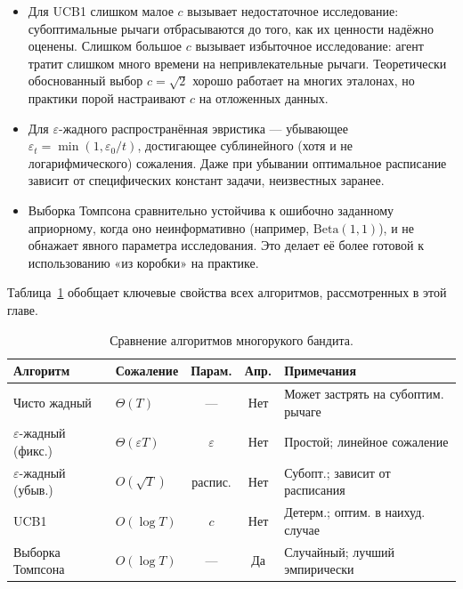 \begin{itemize}[leftmargin=*]
\item Для UCB1 слишком малое $c$ вызывает недостаточное исследование: субоптимальные рычаги отбрасываются до того, как их ценности надёжно оценены.  Слишком большое $c$ вызывает избыточное исследование: агент тратит слишком много времени на непривлекательные рычаги.  Теоретически обоснованный выбор $c=\sqrt{2}$ хорошо работает на многих эталонах, но практики порой настраивают $c$ на отложенных данных.
\item Для $\varepsilon$-жадного распространённая эвристика — убывающее $\varepsilon_t = \min(1, \varepsilon_0/t)$, достигающее сублинейного (хотя и не логарифмического) сожаления.  Даже при убывании оптимальное расписание зависит от специфических констант задачи, неизвестных заранее.
\item Выборка Томпсона сравнительно устойчива к ошибочно заданному априорному, когда оно неинформативно (например, $\mathrm{Beta}(1,1)$), и не обнажает явного параметра исследования.  Это делает её более готовой к использованию «из коробки» на практике.
\end{itemize}

Таблица~\ref{tab:comparison} обобщает ключевые свойства всех алгоритмов, рассмотренных в этой главе.

\begin{table}[ht]
\centering
\caption{Сравнение алгоритмов многорукого бандита.}
\label{tab:comparison}
\footnotesize
\begin{tabular}{@{}llccp{3.5cm}@{}}
\toprule
Алгоритм & Сожаление & Парам. & Апр. & Примечания \\
\midrule
Чисто жадный      & $\Theta(T)$         & ---            & Нет  & Может застрять на субоптим. рычаге \\
$\varepsilon$-жадный (фикс.) & $\Theta(\varepsilon T)$ & $\varepsilon$ & Нет & Простой; линейное сожаление \\
$\varepsilon$-жадный (убыв.) & $O(\sqrt{T})$  & распис. & Нет & Субопт.; зависит от расписания \\
UCB1             & $O(\log T)$         & $c$            & Нет  & Детерм.; оптим. в наихуд. случае \\
Выборка Томпсона & $O(\log T)$        & ---            & Да & Случайный; лучший эмпирически \\
\bottomrule
\end{tabular}
\end{table}


